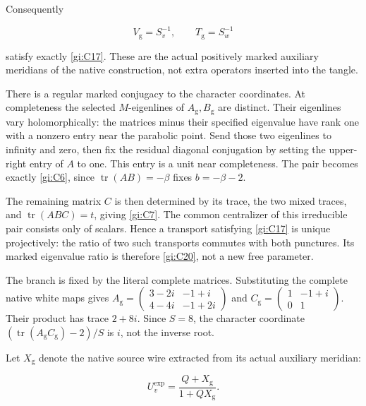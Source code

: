 Consequently

\begin{equation}\label{gi:C34}
V_{\mathrm g}=S_v^{-1},\qquad
                       T_{\mathrm g}=S_w^{-1}
\end{equation}

satisfy exactly \eqref{gi:C17}. These are the actual positively marked auxiliary meridians of the native construction, not extra operators inserted into the tangle.

There is a regular marked conjugacy to the character coordinates. At completeness the selected \(M\)-eigenlines of \(A_{\mathrm g},B_{\mathrm g}\) are distinct. Their eigenlines vary holomorphically: the matrices minus their specified eigenvalue have rank one with a nonzero entry near the parabolic point. Send those two eigenlines to infinity and zero, then fix the residual diagonal conjugation by setting the upper-right entry of \(A\) to one. This entry is a unit near completeness. The pair becomes exactly \eqref{gi:C6}, since \(\operatorname{tr}(AB)=-\beta\) fixes \(b=-\beta-2\).

The remaining matrix \(C\) is then determined by its trace, the two mixed traces, and \(\operatorname{tr}(ABC)=t\), giving \eqref{gi:C7}. The common centralizer of this irreducible pair consists only of scalars. Hence a transport satisfying \eqref{gi:C17} is unique projectively: the ratio of two such transports commutes with both punctures. Its marked eigenvalue ratio is therefore \eqref{gi:C20}, not a new free parameter.

The branch is fixed by the literal complete matrices. Substituting the complete native white maps gives
\(A_{\mathrm g}=\left(\begin{smallmatrix}3-2i&-1+i\\4-4i&-1+2i\end{smallmatrix}\right)\)
and
\(C_{\mathrm g}=\left(\begin{smallmatrix}1&-1+i\\0&1\end{smallmatrix}\right)\).
Their product has trace \(2+8i\). Since \(S=8\), the character coordinate \((\operatorname{tr}(A_{\mathrm g}C_{\mathrm g})-2)/S\) is \(i\), not the inverse root.

Let \(X_{\mathrm g}\) denote the native source wire extracted from its actual auxiliary meridian:

\begin{equation}\label{gi:C35}
U_v^{\exp}=\frac{Q+X_{\mathrm g}}{1+QX_{\mathrm g}}.
\end{equation}

